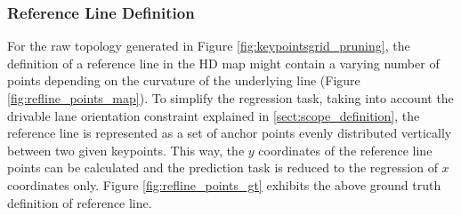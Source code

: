 \documentclass[10pt,twocolumn,letterpaper]{article}
\begin{document}
\subsubsection{Reference Line Definition} 
For the raw topology generated in Figure \ref{fig:keypointsgrid_pruning}, the definition of a reference line in the HD map might contain a varying number of points depending on the curvature of the underlying line (Figure \ref{fig:refline_points_map}). To simplify the regression task, taking into account the drivable lane orientation constraint explained in \ref{sect:scope_definition}, the reference line is represented as a set of anchor points evenly distributed vertically between two given keypoints. This way, the $y$ coordinates of the reference line points can be calculated and the prediction task is reduced to the regression of $x$ coordinates only. Figure \ref{fig:refline_points_gt} exhibits the above ground truth definition of reference line.
\begin{table*}[t]
\caption{Quantitative evaluation of different stages wrt. grid map resolution.}
\label{table:resolution_analysis}
\centering
{}
\end{table*}
\end{document}
